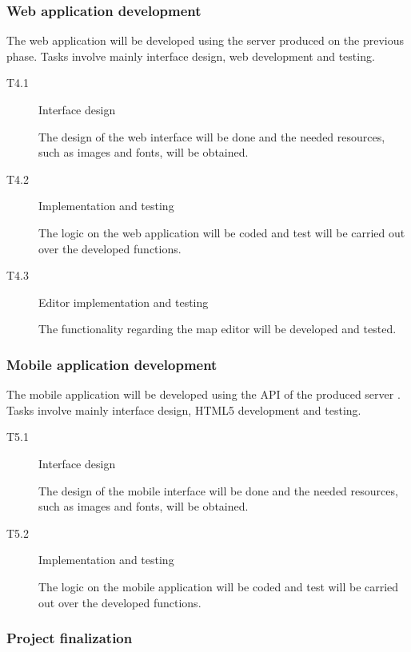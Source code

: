 \subsubsection*{Web application development}

The web application will be developed using the server produced on the previous phase. Tasks involve mainly interface design, web development and testing.

\begin{description}
\item[T4.1] Interface design

The design of the web interface will be done and the needed resources, such as images and fonts, will be obtained.

\item[T4.2] Implementation and testing

The logic on the web application will be coded and test will be carried out over the developed functions.

\item[T4.3] Editor implementation and testing

The functionality regarding the map editor will be developed and tested.
\end{description}

\subsubsection*{Mobile application development}

The mobile application will be developed using the API of the produced server . Tasks involve mainly interface design, HTML5 development and testing.

\begin{description}
\item[T5.1] Interface design

The design of the mobile interface will be done and the needed resources, such as images and fonts, will be obtained.

\item[T5.2] Implementation and testing

The logic on the mobile application will be coded and test will be carried out over the developed functions.

\end{description}

\subsubsection*{Project finalization}


